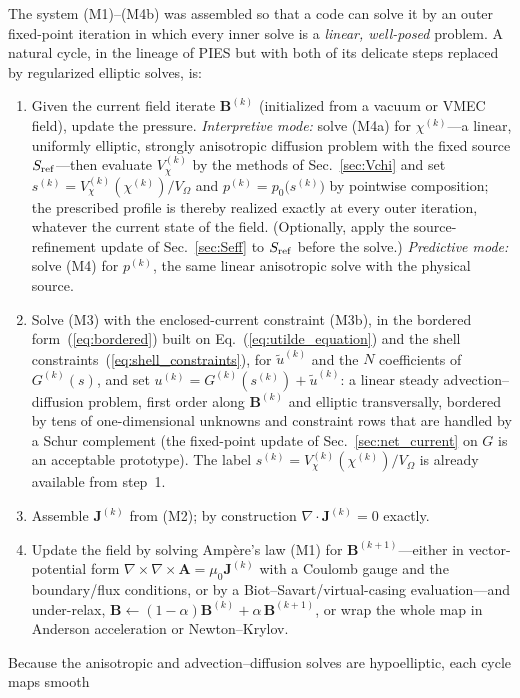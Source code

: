 \documentclass[english]{article}
\newcommand{\bB}{\mathbf{B}}
\newcommand{\bJ}{\mathbf{J}}
\begin{document}
The system (M1)--(M4b) was assembled so that a code can solve it by an outer fixed-point iteration
in which every inner solve is a \emph{linear, well-posed} problem. A natural cycle, in the lineage
of PIES \cite{reiman1986} but with both of its delicate steps replaced by regularized elliptic
solves, is:
\begin{enumerate}
\item Given the current field iterate $\bB^{(k)}$ (initialized from a vacuum or VMEC
\cite{hirshman1983} field), update the pressure. \emph{Interpretive mode:} solve (M4a) for
$\chi^{(k)}$---a linear, uniformly elliptic, strongly anisotropic diffusion problem with the fixed
source $S_{\rm ref}$---then evaluate $V_\chi^{(k)}$ by the methods of Sec.~\ref{sec:Vchi} and set
$s^{(k)}=V_\chi^{(k)}(\chi^{(k)})/V_\Omega$ and
$p^{(k)}=p_0\big(s^{(k)}\big)$ by pointwise composition; the prescribed profile
is thereby realized exactly at every outer iteration, whatever the current state of the field.
(Optionally, apply the source-refinement update of Sec.~\ref{sec:Seff} to $S_{\rm ref}$ before the
solve.) \emph{Predictive mode:} solve (M4) for $p^{(k)}$, the same linear anisotropic solve with
the physical source.
\item Solve (M3) with the enclosed-current constraint (M3b), in the bordered
form~(\ref{eq:bordered}) built on Eq.~(\ref{eq:utilde_equation}) and the shell
constraints~(\ref{eq:shell_constraints}), for $\tilde u^{(k)}$ and the $N$ coefficients of
$G^{(k)}(s)$, and set $u^{(k)}=G^{(k)}(s^{(k)})+\tilde u^{(k)}$: a linear steady
advection--diffusion problem, first order along $\bB^{(k)}$ and elliptic transversally, bordered
by tens of one-dimensional unknowns and constraint rows that are handled by a Schur complement
(the fixed-point update of Sec.~\ref{sec:net_current} on $G$ is an acceptable prototype). The label
$s^{(k)}=V_\chi^{(k)}(\chi^{(k)})/V_\Omega$ is already available from step~1.
\item Assemble $\bJ^{(k)}$ from (M2); by construction $\nabla\cdot\bJ^{(k)}=0$ exactly.
\item Update the field by solving Amp\`ere's law (M1) for $\bB^{(k+1)}$---either in vector-potential
form $\nabla\times\nabla\times\mathbf{A}=\mu_0\bJ^{(k)}$ with a Coulomb gauge and the boundary/flux
conditions, or by a Biot--Savart/virtual-casing evaluation---and under-relax,
$\bB\leftarrow(1-\alpha)\bB^{(k)}+\alpha\,\bB^{(k+1)}$, or wrap the whole map in Anderson
acceleration or Newton--Krylov.
\end{enumerate}
Because the anisotropic and advection--diffusion solves are hypoelliptic, each cycle maps smooth
\end{document}
